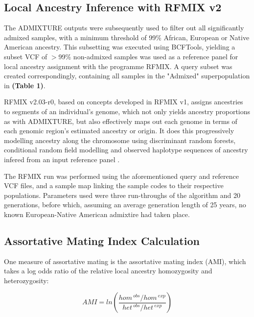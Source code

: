 \documentclass[11pt]{article}
\begin{document}
\subsection{Local Ancestry Inference with RFMIX v2}


The ADMIXTURE outputs were subsequently used to filter out all significantly admixed samples, with a minimum threshold of 99\% African, European or Native American ancestry. This subsetting was executed using BCFTools, yielding a subset VCF of $>$99\% non-admixed samples was used as a reference panel for local ancestry assignment with the programme RFMIX. A query subset was created correspondingly, containing all samples in the "Admixed" superpopulation in \textbf{(Table 1)}.

RFMIX v2.03-r0, based on concepts developed in RFMIX v1, assigns ancestries to segments of an individual's genome, which not only yields ancestry proportions as with ADMIXTURE, but also effectively maps out each genome in terms of each genomic region's estimated ancestry or origin. It does this progressively modelling ancestry along the chromosome using discriminant random forests, conditional random field modelling and observed haplotype sequences of ancestry infered from an input reference panel \parencite{Maples2013}.

The RFMIX run was performed using the aforementioned query and reference VCF files, and a sample map linking the sample codes to their respective populations. Parameters used were three run-throughs of the algorithm and 20 generations, before which, assuming an average generation length of 25 years, no known European-Native American admixtire had taken place.





\subsection{Assortative Mating Index Calculation}


One measure of assortative mating is the assortative mating index (AMI), which takes a log odds ratio of the relative local ancestry homozygosity and heterozygosity:


\begin{equation}
    AMI = ln{\left( \frac{ hom^{\: obs} / hom^{\: exp} }
                         { het^{\: obs} / het^{\: exp} } \right)}
\end{equation}
\vspace{3mm}
\end{document}
